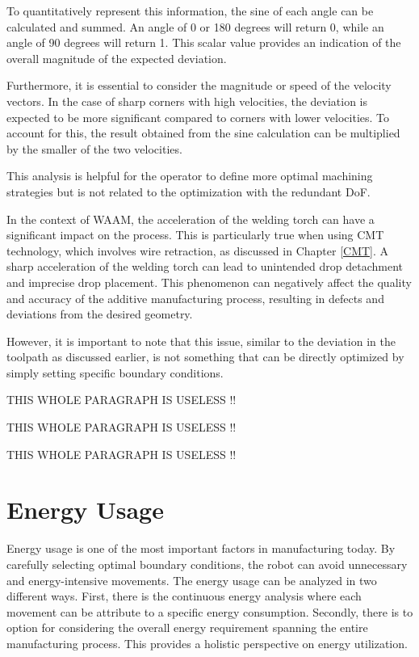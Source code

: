 To quantitatively represent this information, the sine of each angle can be calculated and summed. An angle of 0 or 180 degrees will return 0, while an angle of 90 degrees will return 1. This scalar value provides an indication of the overall magnitude of the expected deviation.

Furthermore, it is essential to consider the magnitude or speed of the velocity vectors. In the case of sharp corners with high velocities, the deviation is expected to be more significant compared to corners with lower velocities. To account for this, the result obtained from the sine calculation can be multiplied by the smaller of the two velocities.

This analysis is helpful for the operator to define more optimal machining strategies but is not related to the optimization with the redundant DoF.

In the context of WAAM, the acceleration of the welding torch can have a significant impact on the process. This is particularly true when using CMT technology, which involves wire retraction, as discussed in Chapter \ref{CMT}. A sharp acceleration of the welding torch can lead to unintended drop detachment and imprecise drop placement. This phenomenon can negatively affect the quality and accuracy of the additive manufacturing process, resulting in defects and deviations from the desired geometry.

However, it is important to note that this issue, similar to the deviation in the toolpath as discussed earlier, is not something that can be directly optimized by simply setting specific boundary conditions. 


THIS WHOLE PARAGRAPH IS USELESS !!


THIS WHOLE PARAGRAPH IS USELESS !!


THIS WHOLE PARAGRAPH IS USELESS !!



\section{Energy Usage}
Energy usage is one of the most important factors in manufacturing today. By carefully selecting optimal boundary conditions, the robot can avoid unnecessary and energy-intensive movements. The energy usage can be analyzed in two different ways. First, there is the continuous energy analysis where each movement can be attribute to a specific energy consumption. Secondly, there is to option for considering the overall energy requirement spanning the entire manufacturing process. This provides a holistic perspective on energy utilization. 

